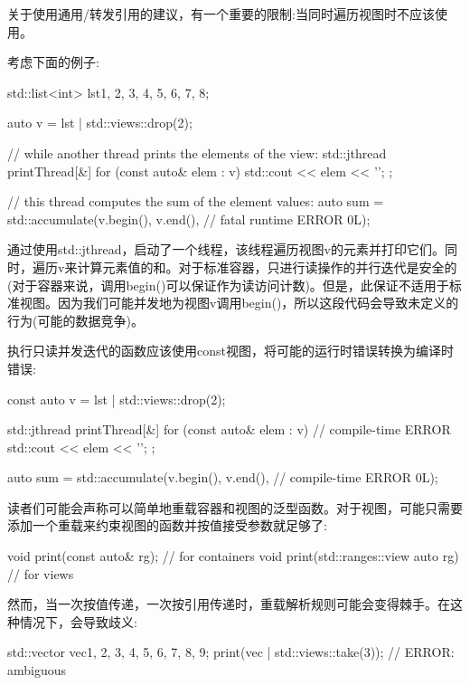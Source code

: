 
关于使用通用/转发引用的建议，有一个重要的限制:当同时遍历视图时不应该使用。

考虑下面的例子:

\begin{cpp}
std::list<int> lst{1, 2, 3, 4, 5, 6, 7, 8};

auto v = lst | std::views::drop(2);

// while another thread prints the elements of the view:
std::jthread printThread{[&] {
		for (const auto& elem : v) {
			std::cout << elem << '\n';
		}
}};

// this thread computes the sum of the element values:
auto sum = std::accumulate(v.begin(), v.end(), // fatal runtime ERROR
0L);
\end{cpp}

通过使用std::jthread，启动了一个线程，该线程遍历视图v的元素并打印它们。同时，遍历v来计算元素值的和。对于标准容器，只进行读操作的并行迭代是安全的(对于容器来说，调用begin()可以保证作为读访问计数)。但是，此保证不适用于标准视图。因为我们可能并发地为视图v调用begin()，所以这段代码会导致未定义的行为(可能的数据竞争)。

执行只读并发迭代的函数应该使用const视图，将可能的运行时错误转换为编译时错误:

\begin{cpp}
const auto v = lst | std::views::drop(2);

std::jthread printThread{[&] {
		for (const auto& elem : v) { // compile-time ERROR
			std::cout << elem << '\n';
		}
}};

auto sum = std::accumulate(v.begin(), v.end(), // compile-time ERROR
0L);
\end{cpp}


读者们可能会声称可以简单地重载容器和视图的泛型函数。对于视图，可能只需要添加一个重载来约束视图的函数并按值接受参数就足够了:

\begin{cpp}
void print(const auto& rg); // for containers
void print(std::ranges::view auto rg) // for views
\end{cpp}

然而，当一次按值传递，一次按引用传递时，重载解析规则可能会变得棘手。在这种情况下，会导致歧义:

\begin{cpp}
std::vector vec{1, 2, 3, 4, 5, 6, 7, 8, 9};
print(vec | std::views::take(3)); // ERROR: ambiguous
\end{cpp}

